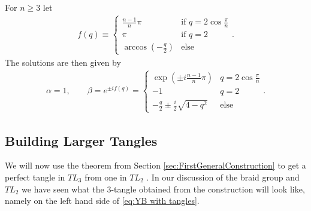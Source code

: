 For $n\geq 3$ let
\begin{align*}
f(q)\equiv 
\begin{cases}
\frac{n-1}{n}\pi & \text{if } q=2\cos \frac{\pi}{n} \\
\pi &\text{if } q = 2 \\
\arccos\left( -\frac{q}{2} \right) & \text{else}
\end{cases}.
\end{align*}
The solutions are then given by
\begin{align*}
\alpha = 1, \qquad \beta = e^{\pm i f(q)}=
\begin{cases}
\exp\left( \pm i \frac{n-1}{n} \pi \right) & q = 2\cos \frac{\pi}{n}\\
-1 & q = 2 \\
-\frac{q}{2} \pm \frac{i}{2}\sqrt{4-q^2} & \text{else}
\end{cases}.
\end{align*}

\subsection*{Building Larger Tangles}

We will now use the theorem from \textsf{Section \ref{sec:FirstGeneralConstruction}} to get a perfect tangle in $TL_3$ from one in $TL_2$ . In our discussion of the braid group and $TL_2$ we have seen what the 3-tangle obtained from the construction will look like, namely on the left hand side of \eqref{eq:YB with tangles}.

